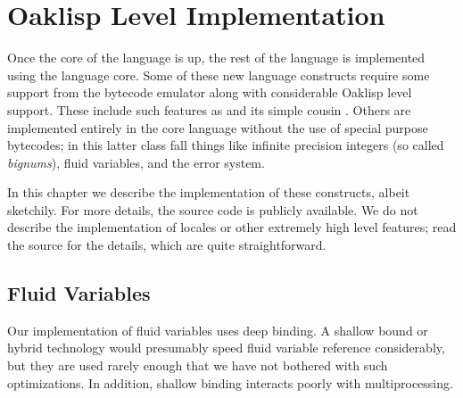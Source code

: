 %
%
%


\chapter{Oaklisp Level Implementation}

Once the core of the language is up, the rest of the language is
implemented using the language core.  Some of these new language
constructs require some support from the bytecode emulator along with
considerable Oaklisp level support.  These include such features as
 and its simple cousin .  Others are implemented
entirely in the core language without the use of special purpose
bytecodes; in this latter class fall things like infinite precision
integers (so called \emph{bignums}), fluid variables, and the error
system.

In this chapter we describe the implementation of these constructs,
albeit sketchily.  For more details, the source code is publicly
available.  We do not describe the implementation of locales or other
extremely high level features; read the source for the details, which
are quite straightforward.


\section{Fluid Variables} \label{fluid-impl}

Our implementation of fluid variables uses deep binding.  A shallow
bound or hybrid technology would presumably speed fluid variable
reference considerably, but they are used rarely enough that we have
not bothered with such optimizations.  In addition, shallow binding
interacts poorly with multiprocessing.


